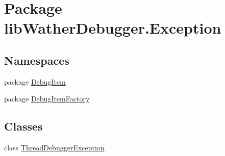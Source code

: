 \hypertarget{namespacelib_wather_debugger_1_1_exception}{\section{Package lib\+Wather\+Debugger.\+Exception}
\label{namespacelib_wather_debugger_1_1_exception}
}
\subsection*{Namespaces}
\begin{DoxyCompactItemize}
\item 
package \hyperlink{namespacelib_wather_debugger_1_1_exception_1_1_debug_item}{Debug\+Item}
\item 
package \hyperlink{namespacelib_wather_debugger_1_1_exception_1_1_debug_item_factory}{Debug\+Item\+Factory}
\end{DoxyCompactItemize}
\subsection*{Classes}
\begin{DoxyCompactItemize}
\item 
class \hyperlink{classlib_wather_debugger_1_1_exception_1_1_thread_debugger_exception}{Thread\+Debugger\+Exception}
\end{DoxyCompactItemize}
